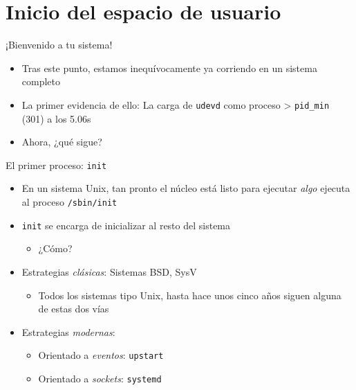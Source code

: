 \documentclass[presentation]{beamer}
\begin{document}
\section{Inicio del espacio de usuario}
\label{sec:org2238a57}
\begin{frame}[label={sec:orgd48d11c},fragile]{¡Bienvenido a tu sistema!}
 \begin{itemize}
\item Tras este punto, estamos inequívocamente ya corriendo en un sistema
completo
\item La primer evidencia de ello: La carga de \texttt{udevd} como proceso >
\texttt{pid\_min} (301) a los 5.06s
\item Ahora, ¿qué sigue?
\end{itemize}
\end{frame}

\begin{frame}[label={sec:orgf2e241a},fragile]{El primer proceso: \texttt{init}}
 \begin{itemize}
\item En un sistema Unix, tan pronto el núcleo está listo para ejecutar
\emph{algo} ejecuta al proceso \texttt{/sbin/init}
\item \texttt{init} se encarga de inicializar al resto del sistema
\begin{itemize}
\item ¿Cómo?
\end{itemize}
\item Estrategias \emph{clásicas}: Sistemas BSD, SysV
\begin{itemize}
\item Todos los sistemas tipo Unix, hasta hace unos cinco años siguen
alguna de estas dos vías
\end{itemize}
\item Estrategias \emph{modernas}:
\begin{itemize}
\item Orientado a \emph{eventos}: \texttt{upstart}
\item Orientado a \emph{sockets}: \texttt{systemd}
\end{itemize}
\end{itemize}
\end{frame}
\end{document}
